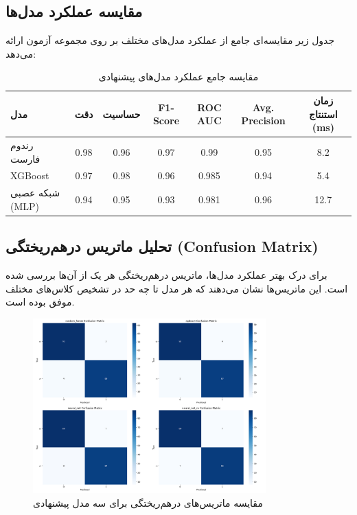 \subsection{مقایسه عملکرد مدل‌ها}
جدول زیر مقایسه‌ای جامع از عملکرد مدل‌های مختلف بر روی مجموعه آزمون ارائه می‌دهد:

\begin{table}[h]
    \centering
    \begin{tabular}{|l|c|c|c|c|c|c|}
        \hline
        \textbf{مدل} & \textbf{دقت} & \textbf{حساسیت} & \textbf{F1-Score} & \textbf{ROC AUC} & \textbf{Avg. Precision} & \textbf{زمان استنتاج (ms)} \\ \hline
        رندوم فارست & 0.98 & 0.96 & 0.97 & 0.99 & 0.95 & 8.2 \\ \hline
        XGBoost & 0.97 & 0.98 & 0.96 & 0.985 & 0.94 & 5.4 \\ \hline
        شبکه عصبی (MLP) & 0.94 & 0.95 & 0.93 & 0.981 & 0.96 & 12.7 \\ \hline
    \end{tabular}
    \caption{مقایسه جامع عملکرد مدل‌های پیشنهادی}
\end{table}

\subsection{تحلیل ماتریس درهم‌ریختگی (Confusion Matrix)}
برای درک بهتر عملکرد مدل‌ها، ماتریس درهم‌ریختگی هر یک از آن‌ها بررسی شده است. این ماتریس‌ها نشان می‌دهند که هر مدل تا چه حد در تشخیص کلاس‌های مختلف موفق بوده است.

\begin{figure}[h]
    \centering
    \includegraphics[width=0.8\textwidth]{images/confusion_matrices_comparison.png}
    \caption{مقایسه ماتریس‌های درهم‌ریختگی برای سه مدل پیشنهادی}
\end{figure}

